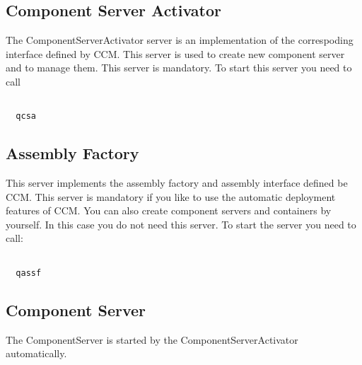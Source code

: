 \documentclass[12pt,a4paper]{report}
\begin{document}
\subsection{Component Server Activator}
\label{sec:ComponentServerActivator}

The ComponentServerActivator server is an implementation of the correspoding interface defined by CCM. This server is used to create new component server and to manage them. This server is mandatory. To start this server you need to call 

\small
\begin{verbatim}

  qcsa

\end{verbatim}
\normalsize

\subsection{Assembly Factory}
\label{sec:AssemblyFactory}

This server implements the assembly factory and assembly interface defined be CCM. This server is mandatory if you like to use the automatic deployment features of CCM. You can also create component servers and containers by yourself. In this case you do not need this server. To start the server you need to call:

\small
\begin{verbatim}

  qassf

\end{verbatim}
\normalsize

\subsection{Component Server}
\label{sec:ComponentServer}

The ComponentServer is started by the ComponentServerActivator automatically.
\end{document}

